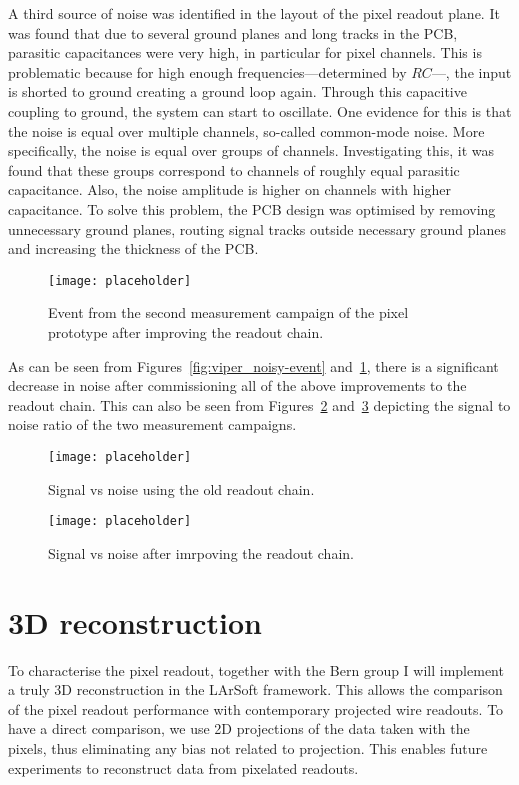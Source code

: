 A third source of noise was identified in the layout of the pixel readout plane.
It was found that due to several ground planes and long tracks in the PCB, parasitic capacitances were very high, in particular for pixel channels.
This is problematic because for high enough frequencies---determined by $RC$---, the input is shorted to ground creating a ground loop again.
Through this capacitive coupling to ground, the system can start to oscillate.
One evidence for this is that the noise is equal over multiple channels, so-called common-mode noise.
More specifically, the noise is equal over groups of channels.
Investigating this, it was found that these groups correspond to channels of roughly equal parasitic capacitance.
Also, the noise amplitude is higher on channels with higher capacitance.
To solve this problem, the PCB design was optimised by removing unnecessary ground planes, routing signal tracks outside necessary ground planes and increasing the thickness of the PCB.

\begin{figure}[htb] %
	\centering
	\texttt{[image: placeholder]}
	\caption{Event from the second measurement campaign of the pixel prototype after improving the readout chain.}
	\label{fig:viper_good-event}
\end{figure}

As can be seen from Figures~\ref{fig:viper_noisy-event} and~\ref{fig:viper_good-event}, there is a significant decrease in noise after commissioning all of the above improvements to the readout chain.
This can also be seen from Figures~\ref{fig:viper_snr-noisy} and~\ref{fig:viper_snr-good} depicting the signal to noise ratio of the two measurement campaigns.

\begin{figure}[htb] %
	\centering
	\texttt{[image: placeholder]}
	\caption{Signal vs noise using the old readout chain.}
	\label{fig:viper_snr-noisy}
\end{figure}

\begin{figure}[htb] %
	\centering
	\texttt{[image: placeholder]}
	\caption{Signal vs noise after imrpoving the readout chain.}
	\label{fig:viper_snr-good}
\end{figure}


\section{3D reconstruction\label{sec:rd-dune-nd_reco}}
To characterise the pixel readout, together with the Bern group I will implement a truly 3D reconstruction in the LArSoft framework.
This allows the comparison of the pixel readout performance with contemporary projected wire readouts.
To have a direct comparison, we use 2D projections of the data taken with the pixels, thus eliminating any bias not related to projection.
This enables future experiments to reconstruct data from pixelated readouts.


